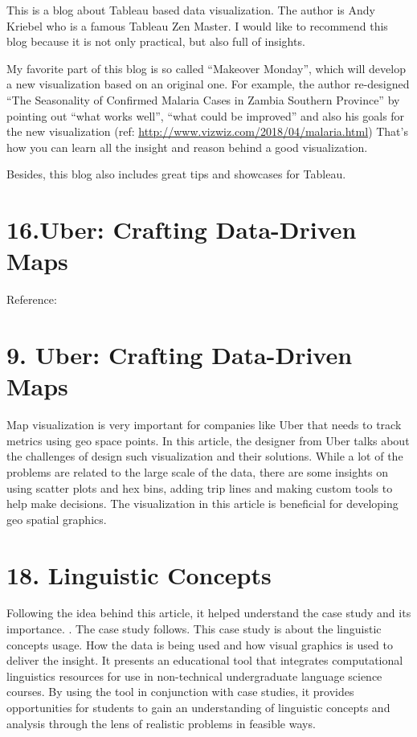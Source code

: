 \documentclass[]{book}
\theoremstyle{definition}
\theoremstyle{definition}
\theoremstyle{definition}
\theoremstyle{remark}
\begin{document}
\citep{uber_maps} This is a blog about Tableau based data visualization.
The author is Andy Kriebel who is a famous Tableau Zen Master. I would
like to recommend this blog because it is not only practical, but also
full of insights.

My favorite part of this blog is so called ``Makeover Monday'', which
will develop a new visualization based on an original one. For example,
the author re-designed ``The Seasonality of Confirmed Malaria Cases in
Zambia Southern Province'' by pointing out ``what works well'', ``what
could be improved'' and also his goals for the new visualization (ref:
\url{http://www.vizwiz.com/2018/04/malaria.html}) That's how you can
learn all the insight and reason behind a good visualization.

Besides, this blog also includes great tips and showcases for Tableau.

\section{16.Uber: Crafting Data-Driven
Maps}\label{uber-crafting-data-driven-maps-1}

Reference: \citep{UKvotes2017}

\section{9. Uber: Crafting Data-Driven
Maps}\label{uber-crafting-data-driven-maps-2}

Map visualization is very important for companies like Uber that needs
to track metrics using geo space points. In this article, the designer
from Uber talks about the challenges of design such visualization and
their solutions. While a lot of the problems are related to the large
scale of the data, there are some insights on using scatter plots and
hex bins, adding trip lines and making custom tools to help make
decisions. The visualization in this article is beneficial for
developing geo spatial graphics.

\section{18. Linguistic Concepts}\label{linguistic-concepts}

\citep{lingui_data}

Following the idea behind this article, it helped understand the case
study and its importance. \citep{article_case}. The case study follows.
This case study is about the linguistic concepts usage. How the data is
being used and how visual graphics is used to deliver the insight. It
presents an educational tool that integrates computational linguistics
resources for use in non-technical undergraduate language science
courses. By using the tool in conjunction with case studies, it provides
opportunities for students to gain an understanding of linguistic
concepts and analysis through the lens of realistic problems in feasible
ways.
\end{document}
